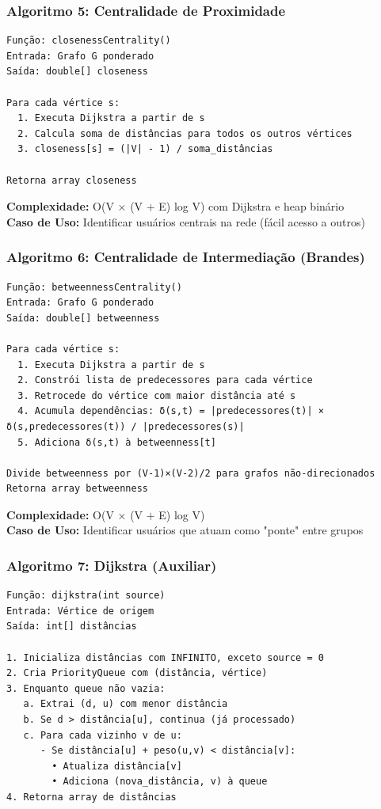 \documentclass[12pt,a4paper]{article}
\begin{document}
\subsubsection{Algoritmo 5: Centralidade de Proximidade}

\begin{verbatim}
Função: closenessCentrality()
Entrada: Grafo G ponderado
Saída: double[] closeness

Para cada vértice s:
  1. Executa Dijkstra a partir de s
  2. Calcula soma de distâncias para todos os outros vértices
  3. closeness[s] = (|V| - 1) / soma_distâncias

Retorna array closeness
\end{verbatim}

\textbf{Complexidade:} O(V × (V + E) log V) com Dijkstra e heap binário \\
\textbf{Caso de Uso:} Identificar usuários centrais na rede (fácil acesso a outros)

\subsubsection{Algoritmo 6: Centralidade de Intermediação (Brandes)}

\begin{verbatim}
Função: betweennessCentrality()
Entrada: Grafo G ponderado
Saída: double[] betweenness

Para cada vértice s:
  1. Executa Dijkstra a partir de s
  2. Constrói lista de predecessores para cada vértice
  3. Retrocede do vértice com maior distância até s
  4. Acumula dependências: δ(s,t) = |predecessores(t)| × δ(s,predecessores(t)) / |predecessores(s)|
  5. Adiciona δ(s,t) à betweenness[t]

Divide betweenness por (V-1)×(V-2)/2 para grafos não-direcionados
Retorna array betweenness
\end{verbatim}

\textbf{Complexidade:} O(V × (V + E) log V) \\
\textbf{Caso de Uso:} Identificar usuários que atuam como "ponte" entre grupos

\subsubsection{Algoritmo 7: Dijkstra (Auxiliar)}

\begin{verbatim}
Função: dijkstra(int source)
Entrada: Vértice de origem
Saída: int[] distâncias

1. Inicializa distâncias com INFINITO, exceto source = 0
2. Cria PriorityQueue com (distância, vértice)
3. Enquanto queue não vazia:
   a. Extrai (d, u) com menor distância
   b. Se d > distância[u], continua (já processado)
   c. Para cada vizinho v de u:
      - Se distância[u] + peso(u,v) < distância[v]:
        • Atualiza distância[v]
        • Adiciona (nova_distância, v) à queue
4. Retorna array de distâncias
\end{verbatim}
\end{document}
